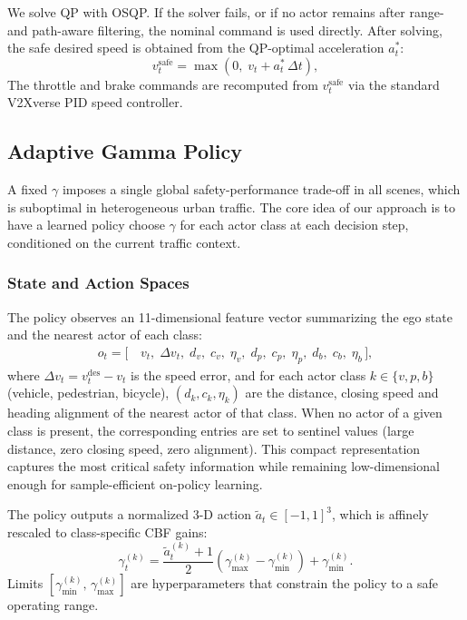 We solve QP with OSQP\cite{stellato2020osqp}. If the solver fails, or if no actor remains after range- and path-aware filtering, the nominal command is used directly. After solving, the safe desired speed is obtained from the QP-optimal acceleration $a_t^{*}$:
\begin{equation}
v_t^{\text{safe}} = \max\!\left(0,\; v_t + a_t^{*}\,\Delta t\right),
\end{equation}
The throttle and brake commands are recomputed from $v_t^{\text{safe}}$ via the standard V2Xverse PID speed controller.

\subsection{Adaptive Gamma Policy}

A fixed $\gamma$ imposes a single global safety-performance trade-off in all scenes, which is suboptimal in heterogeneous urban traffic. The core idea of our approach is to have a learned policy choose $\gamma$ for each actor class at each decision step, conditioned on the current traffic context.

\subsubsection{State and Action Spaces}

The policy observes an 11-dimensional feature vector summarizing the ego state and the nearest actor of each class:
\begin{align}
o_t = \bigl[\,&v_t,\; \Delta v_t,\; d_v,\; c_v,\; \eta_v,\; d_p,\; c_p,\; \eta_p,\; d_b,\; c_b,\; \eta_b\,\bigr],
\end{align}
where $\Delta v_t = v_t^{\text{des}} - v_t$ is the speed error, and for each actor class $k \in \{v, p, b\}$ (vehicle, pedestrian, bicycle), $(d_k, c_k, \eta_k)$ are the distance, closing speed and heading alignment of the nearest actor of that class. When no actor of a given class is present, the corresponding entries are set to sentinel values (large distance, zero closing speed, zero alignment). This compact representation captures the most critical safety information while remaining low-dimensional enough for sample-efficient on-policy learning.

The policy outputs a normalized 3-D action $\tilde{a}_t \in [-1,1]^3$, which is affinely rescaled to class-specific CBF gains:
\begin{equation}
\gamma_t^{(k)} = \frac{\tilde{a}_t^{(k)} + 1}{2}\left(\gamma_{\max}^{(k)} - \gamma_{\min}^{(k)}\right) + \gamma_{\min}^{(k)}.
\end{equation}
Limits $[\gamma_{\min}^{(k)},\, \gamma_{\max}^{(k)}]$ are hyperparameters that constrain the policy to a safe operating range.

